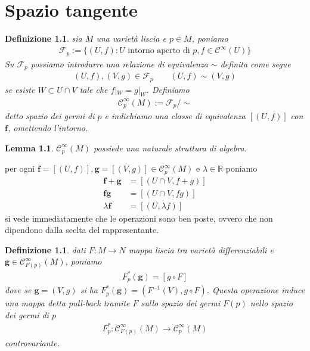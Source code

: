 \documentclass[oneside, 11pt]{amsbook}
\makeatletter
\newcommand{\C}{\mathcal{C}}
\newcommand{\R}{\mathbb{R}}
\newcommand{\f}{\mathbf{f}}
\newcommand{\g}{\mathbf{g}}
\newcommand{\co}[1]{\textit{#1}}
\newcommand{\0}{{(0)}}
\newcommand{\3}{{(3)}}
\theoremstyle{colonplain}
\newtheorem{lemma}[thm]{Lemma}
\theoremstyle{colondefinition}
\newtheorem{defn}[thm]{Definizione}
\theoremstyle{colonremark}
\numberwithin{equation}{chapter}
\renewcommand{\proofname}{Dimostrazione}
\renewenvironment{proof}[1][\proofname]{\par
  \pushQED{\qed}%
  \normalfont \topsep6\p@\@plus6\p@\relax
  \trivlist
  \item[\hskip\labelsep\bfseries #1:]\ignorespaces
}{%
  \popQED\endtrivlist\@endpefalse
}
\makeatother
\begin{document}
\chapter{Spazio tangente}
\begin{defn}
    sia $M$ una varietà liscia e $p \in M$, poniamo
    \begin{align}
        \mathscr{F}_p := \{(U, f) : U \text{ intorno aperto di } p, f \in \C^\infty(U)\}
    \end{align}
    Su $\mathscr{F}_p$ possiamo introdurre una relazione di equivalenza $\sim$ definita come segue
    \begin{align}
        (U, f), (V, g) \in \mathscr{F}_p \qquad (U, f) \sim (V, g)
    \end{align}
    se esiste $W \subset U \cap V$ tale che $f|_W = g|_W$. Definiamo
    \begin{align}
        \C^\infty_p(M) := \mathscr{F}_p / \sim
    \end{align}
    detto \co{spazio dei germi di} $p$ e indichiamo una classe di equivalenza $[(U, f)]$ con $\f$, omettendo l'intorno.
\end{defn}
\begin{lemma}
    $\C^\infty_p(M)$ possiede una naturale struttura di algebra.
\end{lemma}
\begin{proof}
    per ogni $\f = [(U, f)], \g = [(V, g)] \in \C^\infty_p(M)$ e $\lambda \in \R$ poniamo
    \begin{align}
        \f + \g &= [(U \cap V, f + g)] \\
        \f\g &= [(U \cap V, fg)] \\
        \lambda \f &= [(U, \lambda f)]
    \end{align}
    si vede immediatamente che le operazioni sono ben poste, ovvero che non dipendono dalla scelta del rappresentante.
\end{proof}
\begin{defn}
    dati $F : M \longrightarrow N$ mappa liscia tra varietà differenziabili e $\g \in \C^\infty_{F(p)}(M)$, poniamo
    \begin{align}
        F^*_p(\g) = [g \circ F]
    \end{align}
    dove se $\g = (V, g)$ si ha $F^*_p(\g) = (F^{-1}(V), g \circ F)$. Questa operazione induce una mappa detta \co{pull-back} tramite $F$ sullo spazio dei germi $F(p)$ nello spazio dei germi di $p$
    \begin{align}
        F^*_p : \C^\infty_{F(p)}(M) \longrightarrow \C^\infty_p(M)
    \end{align}
    controvariante.
\end{defn}
\end{document}
